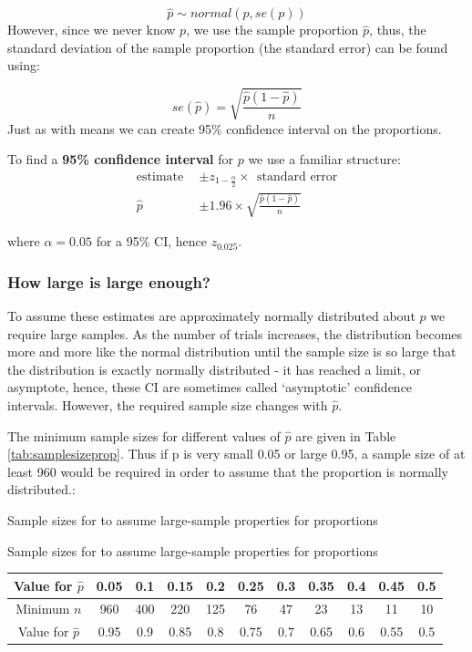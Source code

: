 \documentclass[
  oneside]{krantz}
\begin{document}
\[\hat{p} \sim normal \left(p, se({p})\right)\]
However, since we never know \(p\), we use the sample proportion \(\hat p\), thus, the standard deviation of the sample proportion (the standard error) can be found using:

\[se(\hat{p})=\sqrt{\frac{\hat p (1-\hat p)}{n}}\]
Just as with means we can create 95\% confidence interval on the proportions.

To find a \textbf{95\% confidence interval} for \(p\) we use a familiar structure:
\begin{align*}
          \textrm{estimate}~~ &\pm z_{1-\frac{\alpha}{2}} \times~~ \textrm{standard error}\\
          \hat{p} & \pm 1.96 \times \sqrt{\frac{\hat{p} (1-\hat{p})}{n}}
\end{align*}

where \(\alpha=0.05\) for a 95\% CI, hence \(z_{0.025}\).

\hypertarget{how-large-is-large-enough}{%
\subsubsection{How large is large enough?}\label{how-large-is-large-enough}}

To assume these estimates are approximately normally distributed about \(p\) we require large samples. As the number of trials increases, the distribution becomes more and more like the normal distribution until the sample size is so large that the distribution is exactly normally distributed - it has reached a limit, or asymptote, hence, these CI are sometimes called `asymptotic' confidence intervals. However, the required sample size changes with \(\hat{p}\).

The minimum sample sizes for different values of \(\hat p\) are given in Table \ref{tab:samplesizeprop}. Thus if p is very small 0.05 or large 0.95, a sample size of at least 960 would be required in order to assume that the proportion is normally distributed.:

\label{tab:samplesizeprop} Sample sizes for to assume large-sample properties for proportions

\begin{table}
\label{samplesizeprop}
\caption{Sample sizes for to assume large-sample properties for proportions}
\end{table}

\begin{longtable}[]{@{}ccccccccccc@{}}
\toprule
Value for \(\hat{p}\) & 0.05 & 0.1 & 0.15 & 0.2 & 0.25 & 0.3 & 0.35 & 0.4 & 0.45 & 0.5\tabularnewline
\midrule
\endhead
Minimum \(n\) & 960 & 400 & 220 & 125 & 76 & 47 & 23 & 13 & 11 & 10\tabularnewline
Value for \(\hat{p}\) & 0.95 & 0.9 & 0.85 & 0.8 & 0.75 & 0.7 & 0.65 & 0.6 & 0.55 & 0.5\tabularnewline
\bottomrule
\end{longtable}
\end{document}

